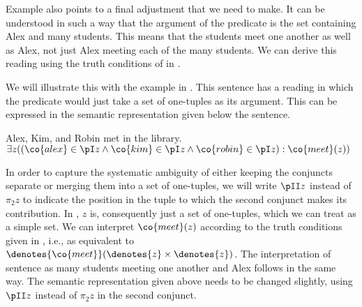 \documentclass[output=paper]{langsci/langscibook}
\begin{document}
Example  also points to a final adjustment that we need to make. 
It can be understood in such a way that the argument of the predicate  is the set containing Alex and many students. This means that the students meet one another as well as Alex, not just Alex
meeting each of the many students.
We can derive this reading using the truth conditions of  in .





We will illustrate this with the example in  .
This sentence has a reading in which the predicate  would just take a set of one-tuples as its argument. 
This can be expressed in the semantic representation given below the sentence.

\ea \label{alex-kim-robin}
Alex, Kim, and Robin met in the library.\\
$\exists z ((
\co{alex} \in \pI z
\land \co{kim} \in \pI z
\land \co{robin} \in \pI z
): \co{meet}(z)
)$
\z 


In order to capture the systematic ambiguity of either keeping the conjuncts separate or merging them into a set of one-tuples,
we will write $\pII z$ instead of $\pi_2 z$ to indicate the position in the tuple to which the second conjunct makes its contribution.
In , $z$ is, consequently just a set of one-tuples, which we can treat as a simple set. We can interpret $\co{meet}(z)$ according to the truth conditions given in  , i.e., as equivalent to $\denotes{\co{meet}} (\denotes{z} \times \denotes{z})$. 
%
The interpretation of sentence  as many students meeting one another and Alex follows in the same way. 
The semantic representation given above needs to be changed slightly, using $\pII z$ instead of $\pi_2 z$ in the second conjunct.
\end{document}
